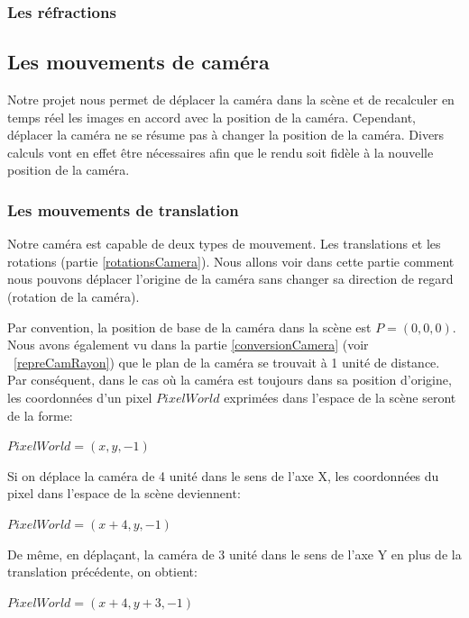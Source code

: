 \documentclass[11pt]{article}
\begin{document}
\subsubsection{Les réfractions}

\subsection{Les mouvements de caméra}

Notre projet nous permet de déplacer la caméra dans la scène et de recalculer en temps réel les images en accord avec la position de la caméra. Cependant, déplacer la caméra ne se résume pas à changer la position de la caméra. Divers calculs vont en effet être nécessaires afin que le rendu soit fidèle à la nouvelle position de la caméra.
\subsubsection{Les mouvements de translation}
Notre caméra est capable de deux types de mouvement. Les translations et les rotations (partie \ref{rotationsCamera}). Nous allons voir dans cette partie comment nous pouvons déplacer l'origine de la caméra sans changer sa direction de regard (rotation de la caméra).

Par convention, la position de base de la caméra dans la scène est $P=(0, 0, 0)$. Nous avons également vu dans la partie \ref{conversionCamera} (voir \figurename\ \ref{repreCamRayon}) que le plan de la caméra se trouvait à 1 unité de distance. Par conséquent, dans le cas où la caméra est toujours dans sa position d'origine, les coordonnées d'un pixel $PixelWorld$ exprimées dans l'espace de la scène seront de la forme:

\begin{center}
	$PixelWorld = (x, y, -1)$
\end{center}

Si on déplace la caméra de 4 unité dans le sens de l'axe X, les coordonnées du pixel dans l'espace de la scène deviennent:

\begin{center}
	$PixelWorld = (x + 4, y, -1)$
\end{center}

De même, en déplaçant, la caméra de 3 unité dans le sens de l'axe Y en plus de la translation précédente, on obtient:

\begin{center}
	$PixelWorld = (x + 4, y + 3, -1)$
\end{center}
\end{document}
